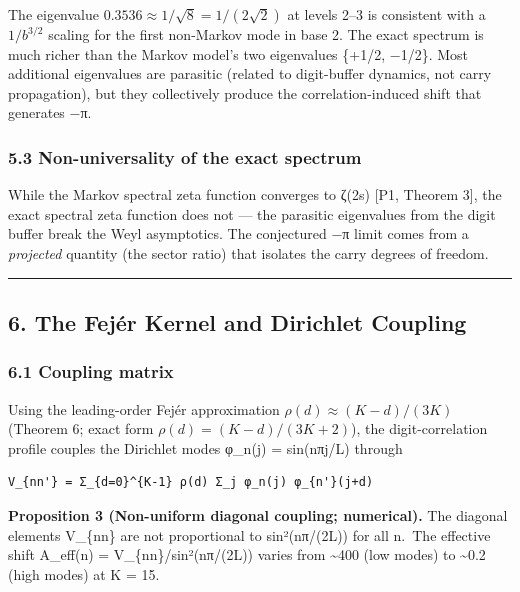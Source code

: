 \documentclass[
  11pt,
]{article}
\begin{document}
The eigenvalue \(0.3536 \approx 1/\sqrt{8} = 1/(2\sqrt{2})\) at levels 2--3 is
consistent with a \(1/b^{3/2}\) scaling for the first non-Markov mode in base 2.
The exact spectrum is much richer than the Markov model's two eigenvalues
\{+1/2, −1/2\}. Most additional eigenvalues are parasitic (related to
digit-buffer dynamics, not carry propagation), but they collectively produce the
correlation-induced shift that generates −π.

\subsubsection{5.3 Non-universality of the exact
spectrum}\label{non-universality-of-the-exact-spectrum}

While the Markov spectral zeta function converges to ζ(2s) {[}P1, Theorem 3{]},
the exact spectral zeta function does not --- the parasitic eigenvalues from the
digit buffer break the Weyl asymptotics. The conjectured −π limit comes from a
\emph{projected} quantity (the sector ratio) that isolates the carry degrees of
freedom.

\begin{center}\rule{0.5\linewidth}{0.5pt}\end{center}

\newpage

\subsection{6. The Fejér Kernel and Dirichlet
Coupling}\label{the-fejuxe9r-kernel-and-dirichlet-coupling}

\subsubsection{6.1 Coupling matrix}\label{coupling-matrix}

Using the leading-order Fejér approximation \(\rho(d) \approx (K-d)/(3K)\)
(Theorem 6; exact form \(\rho(d) = (K-d)/(3K+2)\)), the digit-correlation
profile couples the Dirichlet modes φ\_n(j) = sin(nπj/L) through

\begin{verbatim}
V_{nn'} = Σ_{d=0}^{K-1} ρ(d) Σ_j φ_n(j) φ_{n'}(j+d)
\end{verbatim}

\textbf{Proposition 3 (Non-uniform diagonal coupling; numerical).} The diagonal
elements V\_\{nn\} are not proportional to sin²(nπ/(2L)) for all n.~The
effective shift A\_eff(n) = V\_\{nn\}/sin²(nπ/(2L)) varies from
\textasciitilde400 (low modes) to \textasciitilde0.2 (high modes) at K = 15.
\end{document}
